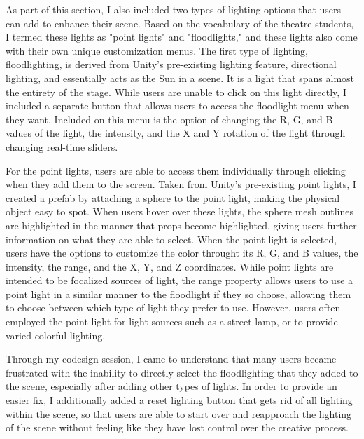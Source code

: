 \documentclass[10pt,twocolumn]{article}
\begin{document}
As part of this section, I also included two types of lighting options that users can add to enhance their scene. Based on the vocabulary of the theatre students, I termed these lights as "point lights" and "floodlights," and these lights also come with their own unique customization menus. The first type of lighting, floodlighting, is derived from Unity's pre-existing lighting feature, directional lighting, and essentially acts as the Sun in a scene. It is a light that spans almost the entirety of the stage. While users are unable to click on this light directly, I included a separate button that allows users to access the floodlight menu when they want. Included on this menu is the option of changing the R, G, and B values of the light, the intensity, and the X and Y rotation of the light through changing real-time sliders.  

For the point lights, users are able to access them individually through clicking when they add them to the screen. Taken from Unity's pre-existing point lights, I created a prefab by attaching a sphere to the point light, making the physical object easy to spot. When users hover over these lights, the sphere mesh outlines are highlighted in the manner that props become highlighted, giving users further information on what they are able to select. When the point light is selected, users have the options to customize the color throught its R, G, and B values, the intensity, the range, and the X, Y, and Z coordinates. While point lights are intended to be focalized sources of light, the range property allows users to use a point light in a similar manner to the floodlight if they so choose, allowing them to choose between which type of light they prefer to use. However, users often employed the point light for light sources such as a street lamp, or to provide varied colorful lighting.  

Through my codesign session, I came to understand that many users became frustrated with the inability to directly select the floodlighting that they added to the scene, especially after adding other types of lights. In order to provide an easier fix, I additionally added a reset lighting button that gets rid of all lighting within the scene, so that users are able to start over and reapproach the lighting of the scene without feeling like they have lost control over the creative process. 
\end{document}
